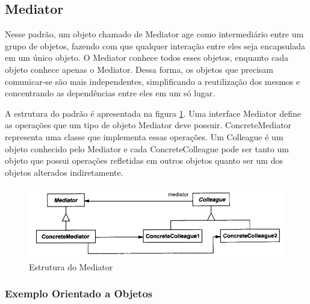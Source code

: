 \subsection{Mediator}


Nesse padrão, um objeto chamado de Mediator age como intermediário 
entre um grupo de objetos, fazendo com que qualquer interação entre 
eles seja encapsulada em um único objeto. O Mediator conhece todos 
esses objetos, enquanto cada objeto conhece apenas o 
Mediator. Dessa forma, os objetos que precisam comunicar-se são 
mais independentes, simplificando a reutilização dos 
mesmos e concentrando as dependências entre eles 
em um só lugar. 

A estrutura do padrão é apresentada na figura \ref{mediator_struct}. 
Uma interface Mediator define as operações que um tipo de 
objeto Mediator deve possuir. ConcreteMediator representa 
uma classe que implementa essas operações. Um Colleague 
é um objeto conhecido pelo Mediator e cada ConcreteColleague 
pode ser tanto um objeto que possui operações refletidas 
em outros objetos quanto ser um dos objetos alterados 
indiretamente.


\begin{figure}[htb]
	\caption{\label{mediator_struct}Estrutura do Mediator}
	\begin{center}
	    \includegraphics[scale=0.5]{5_padroes-contexto-funcional/5.3_comportamentais/5.3.05_mediator/diagram.png}
	\end{center}
\end{figure}



\subsubsection*{Exemplo Orientado a Objetos}





